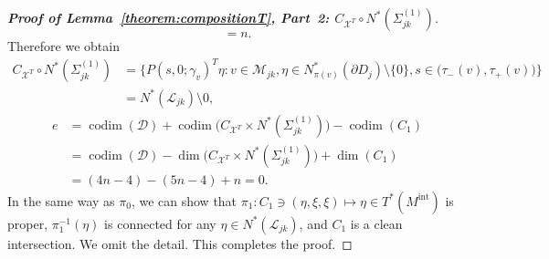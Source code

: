 \documentclass[a4paper,11pt,reqno]{amsart}
\numberwithin{equation}{section}
\theoremstyle{definition}
\theoremstyle{remark}
\begin{document}
\begin{proof}[{\bf Proof of Lemma~\ref{theorem:compositionT}, Part~2: $C_{\mathcal{X}^T}{\circ}N^\ast(\Sigma_{jk}^{(1)})$}]
$$=
n. 
$$
%
%
Therefore we obtain
%
%
\begin{align*}
  C_{\mathcal{X}^T}{\circ}N^\ast(\Sigma_{jk}^{(1)})
& =
  \bigl\{
  P(s,0;\gamma_v)^T\eta:
  v \in \mathcal{M}_{jk}, 
  \eta \in N^\ast_{\pi(v)}(\partial{D_j})\setminus\{0\}, 
  s \in \bigl(\tau_-(v),\tau_+(v)\bigr)
  \bigr\}
\\
& =
  N^\ast(\mathcal{L}_{jk})\setminus0, 
\end{align*}
%
%
%
%
\begin{align*}
  e
& =
  \operatorname{codim}(\mathcal{D})
  +
  \operatorname{codim}
  \bigl(C_{\mathcal{X}^T}{\times}N^\ast(\Sigma_{jk}^{(1)})\bigr)
  -
  \operatorname{codim}(C_1)
\\
& =
  \operatorname{codim}(\mathcal{D})
  -
  \operatorname{dim}
  \bigl(C_{\mathcal{X}^T}{\times}N^\ast(\Sigma_{jk}^{(1)})\bigr)
  +
  \operatorname{dim}(C_1) 
\\
& =
  (4n-4)-(5n-4)+n
  =
  0.
\end{align*}
%
%
In the same way as $\pi_0$, we can show that 
$\pi_1:C_1\ni(\eta,\xi,\xi)\mapsto\eta\in{T^\ast(M^\text{int})}$ is proper, 
$\pi_1^{-1}(\eta)$ is connected for any $\eta \in N^\ast(\mathcal{L}_{jk})$, 
and $C_1$ is a clean intersection. We omit the detail. This completes the proof. 
\end{proof}
%
%
%
%
\end{document}
